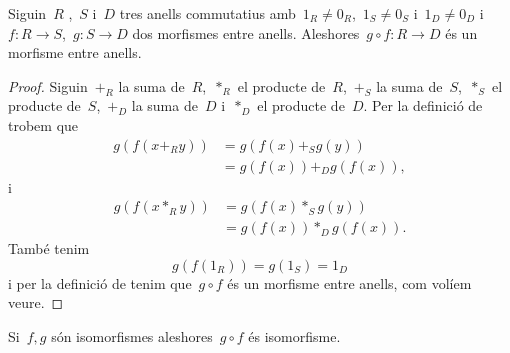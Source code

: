 \documentclass[../../Main.tex]{subfiles}
\begin{document}
	\begin{proposition}
		\label{prop:operació morfismes entre anells és morfisme entre anells}
		Siguin~\(R\) ,~\(S\) i~\(D\) tres anells commutatius amb~\(1_{R}\neq0_{R}\),~\(1_{S}\neq0_{S}\) i~\(1_{D}\neq0_{D}\) i~\(f\colon R\longrightarrow S\),~\(g\colon S\longrightarrow D\) dos morfismes entre anells.
		Aleshores~\(g\circ f\colon R\longrightarrow D\) és un morfisme entre anells.
		\begin{proof}
			Siguin~\(+_{R}\) la suma de~\(R\),~\(\ast_{R}\) el producte de~\(R\),~\(+_{S}\) la suma de~\(S\),~\(\ast_{S}\) el producte de~\(S\),~\(+_{D}\) la suma de~\(D\) i~\(\ast_{D}\) el producte de~\(D\).
			Per la definició de  trobem que
			\begin{align*}
			g(f(x+_{R}y))&=g(f(x)+_{S}g(y))\\
			&=g(f(x))+_{D}g(f(x)),
			\end{align*}
			i
			\begin{align*}
			g(f(x\ast_{R}y))&=g(f(x)\ast_{S}g(y))\\
			&=g(f(x))\ast_{D}g(f(x)).
			\end{align*}
			També tenim
			\[
			    g(f(1_{R}))=g(1_{S})=1_{D}
			\]
			i per la definició de  tenim que~\(g\circ f\) és un morfisme entre anells, com volíem veure.
		\end{proof}
	\end{proposition}
	\begin{corollary}
		\label{corollary:conjugació isomorfismes enre anells és isomorfisme entre anells}
		Si~\(f,g\) són isomorfismes aleshores~\(g\circ f\) és isomorfisme.
	\end{corollary}
\end{document}
